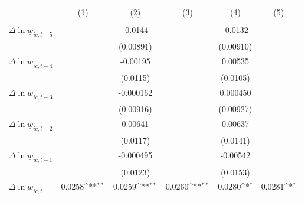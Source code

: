 {
\def\sym#1{\ifmmode^{#1}\else\(^{#1}\)\fi}
\begin{tabular}{l*{5}{c}}
\hline\hline
          &&&&&\\
          &&&&&\\
\hline
$\Delta \ln \underline{w}_{ic,t-5}$&                  &  -0.0144         &                  &  -0.0132         &                  \\
          &                  &(0.00891)         &                  &(0.00910)         &                  \\
[1em]
$\Delta \ln \underline{w}_{ic,t-4}$&                  & -0.00195         &                  &  0.00535         &                  \\
          &                  & (0.0115)         &                  & (0.0105)         &                  \\
[1em]
$\Delta \ln \underline{w}_{ic,t-3}$&                  &-0.000162         &                  & 0.000450         &                  \\
          &                  &(0.00916)         &                  &(0.00927)         &                  \\
[1em]
$\Delta \ln \underline{w}_{ic,t-2}$&                  &  0.00641         &                  &  0.00637         &                  \\
          &                  & (0.0117)         &                  & (0.0141)         &                  \\
[1em]
$\Delta \ln \underline{w}_{ic,t-1}$&                  &-0.000495         &                  & -0.00542         &                  \\
          &                  & (0.0123)         &                  & (0.0153)         &                  \\
[1em]
$\Delta \ln \underline{w}_{ic,t}$&   0.0258\sym{**} &   0.0259\sym{**} &   0.0260\sym{**} &   0.0280\sym{*}  &   0.0281\sym{*}  \\

\end{tabular}}
